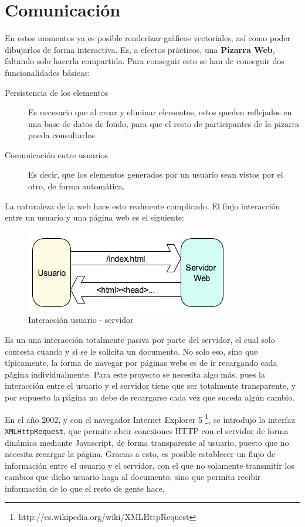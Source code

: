 \section{Comunicación} %
\label{sec:javascript_comunicacion}
En estos momentos ya es posible renderizar gráficos vectoriales, así como poder dibujarlos de forma interactiva. Es, a efectos prácticos, una \textbf{Pizarra Web}, faltando solo hacerla compartida. Para conseguir esto se han de conseguir dos funcionalidades básicas:

\begin{description}
  \item[Persistencia de los elementos] Es necesario que al crear y eliminar elementos, estos queden reflejados en una base de datos de fondo, para que el resto de participantes de la pizarra pueda consultarlos.
  \item[Comunicación entre usuarios] Es decir, que los elementos generados por un usuario sean vistos por el otro, de forma automática.
\end{description}

La naturaleza de la web hace esto realmente complicado. El flujo interacción entre un usuario y una página web es el siguiente:

\begin{figure}[h!]
\centering
\includegraphics{navigation.png}
\caption{Interacción usuario - servidor}\label{fig:navigation}
\end{figure}

Es un una interacción totalmente pasiva por parte del servidor, el cual solo contesta cuando y si se le solicita un documento. No solo eso, sino que típicamente, la forma de navegar por páginas webs es de ir recargando cada página individualmente. Para este proyecto se necesita algo más, pues la interacción entre el usuario y el servidor tiene que ser totalmente transparente, y por supuesto la página no debe de recargarse cada vez que suceda algún cambio.

En el año 2002, y con el navegador Internet Explorer 5 \footnote{http://es.wikipedia.org/wiki/XMLHttpRequest}, se introdujo la interfaz \texttt{XMLHttpRequest}, que permite abrir conexiones  HTTP con el servidor de forma dinámica mediante Javascript, de forma transparente al usuario, puesto que no necesita recargar la página. Gracias a esto, es posible establecer un flujo de información entre el usuario y el servidor, con el que no solamente transmitir los cambios que dicho usuario haga al documento, sino que permita recibir información de lo que el resto de gente hace.


